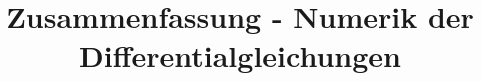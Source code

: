 \documentclass[a4paper,11pt,DIV0]{scrreprt}
\theoremstyle{definition}
\begin{document}
\title{Zusammenfassung - Numerik der Differentialgleichungen}
\author{}
\date{}
\maketitle
\newpage





\end{document}

